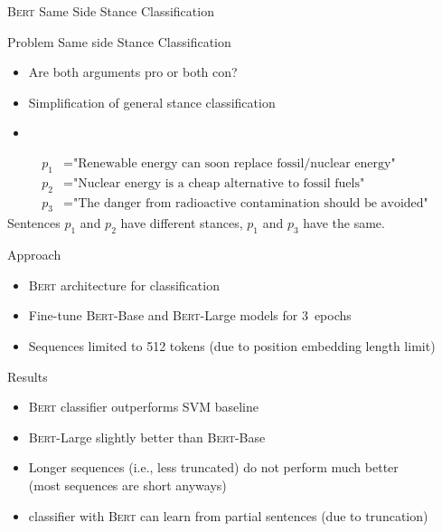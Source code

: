 \documentclass[english,handout]{mlutalk}
\newcommand{\Bert}{\textsc{Bert}\xspace}
\newcommand{\BertBase}{\textsc{Bert}-Base\xspace}
\newcommand{\BertLarge}{\textsc{Bert}-Large\xspace}
\begin{document}
\begin{frame}[allowframebreaks]{\Bert Same Side Stance Classification~\cite{OllingerDSBS2020}}
  
  \begin{block}{Problem}
    Same side  Stance Classification
    \begin{itemize}
      \item Are both arguments pro or both con?
      \item Simplification of general stance classification
      \item 
    \end{itemize}
  \end{block}

  \begin{example}
    \begin{align}
      p_1 &= \text{"Renewable energy can soon replace fossil/nuclear energy"} \\
      p_2 &= \text{"Nuclear energy is a cheap alternative to fossil fuels"} \\
      p_3 &= \text{"The danger from radioactive contamination should be avoided"}
    \end{align}
    Sentences \(p_1\) and \(p_2\) have different stances, \(p_1\) and \(p_3\) have the same.
  \end{example}
  
  \framebreak
  
  \begin{block}{Approach}
    \begin{itemize}
      \item \Bert architecture for classification
      \item Fine-tune \BertBase and \BertLarge models for 3~epochs
      \item Sequences limited to 512 tokens (due to position embedding length limit)
    \end{itemize}
  \end{block}

  \begin{block}{Results}
    \begin{itemize}
      \item \Bert classifier outperforms SVM baseline
      \item \BertLarge slightly better than \BertBase
      \item Longer sequences (i.e., less truncated) do not perform much better \\ (most sequences are short anyways)
      \item classifier with \Bert can learn from partial sentences (due to truncation)
    \end{itemize}
  \end{block}

\end{frame}
\end{document}
